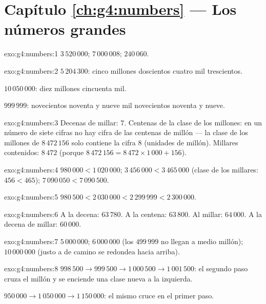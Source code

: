 \section*{Capítulo \ref{ch:g4:numbers} --- Los números grandes}

\begin{solution}{exo:g4:numbers:1}
$3\,520\,000$; \quad $7\,000\,008$; \quad $240\,060$.
\end{solution}

\begin{solution}{exo:g4:numbers:2}
$5\,204\,300$: cinco millones doscientos cuatro mil trescientos.

$10\,050\,000$: diez millones cincuenta mil.

$999\,999$: novecientos noventa y nueve mil novecientos
noventa y nueve.
\end{solution}

\begin{solution}{exo:g4:numbers:3}
Decenas de millar: $7$. Centenas de la clase de los millones: en un número de siete
cifras no hay cifra de las centenas de millón --- la clase de los millones
de $8\,472\,156$ solo contiene la cifra $8$ (unidades de
millón). Millares contenidos: $8\,472$ (porque
$8\,472\,156 = 8\,472 \times 1\,000 + 156$).
\end{solution}

\begin{solution}{exo:g4:numbers:4}
$980\,000 < 1\,020\,000$; \quad
$3\,456\,000 < 3\,465\,000$ (clase de los millares: $456 < 465$); \quad
$7\,090\,050 < 7\,090\,500$.
\end{solution}

\begin{solution}{exo:g4:numbers:5}
$980\,500 < 2\,030\,000 < 2\,299\,999 < 2\,300\,000$.
\end{solution}

\begin{solution}{exo:g4:numbers:6}
A la decena: $63\,780$. A la centena: $63\,800$. Al millar:
$64\,000$. A la decena de millar: $60\,000$.
\end{solution}

\begin{solution}{exo:g4:numbers:7}
$5\,000\,000$; \quad $6\,000\,000$ (los $499\,999$ no llegan a
medio millón); \quad $10\,000\,000$ (justo a  de camino se redondea hacia arriba).
\end{solution}

\begin{solution}{exo:g4:numbers:8}
$998\,500 \to 999\,500 \to 1\,000\,500 \to 1\,001\,500$: el segundo
paso cruza el millón y se enciende una clase nueva a la izquierda.

$950\,000 \to 1\,050\,000 \to 1\,150\,000$: el mismo cruce en el
primer paso.
\end{solution}

